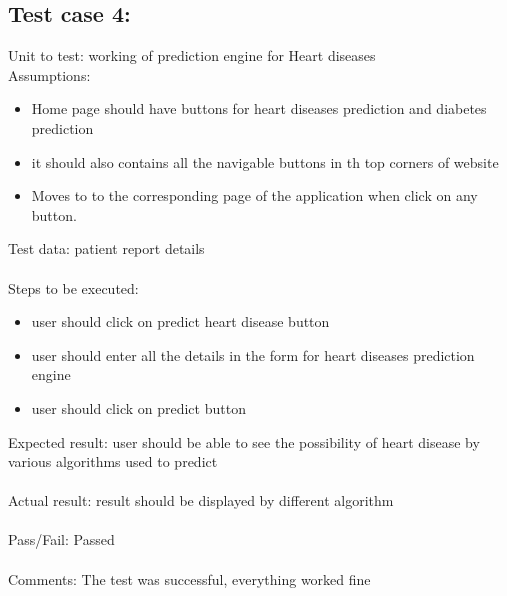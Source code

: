 \documentclass[oneside,12pt]{Classes/VTU}
\begin{document}
	\subsection{Test case 4:}
	Unit to test: working of prediction engine for Heart diseases \\
	Assumptions:\\
	\begin{itemize}
		\item Home page should have buttons for heart diseases prediction and diabetes prediction
		\item it should also contains all the navigable buttons in th top corners of website
		\item Moves to to the corresponding page of the application when click on any button.
	\end{itemize}
	Test data: patient report details\\
	\\
	Steps to be executed:\\
	\begin{itemize}
		\item user should click on predict heart disease button
		\item user should enter all the details in the form for heart diseases prediction engine
		\item user should click on predict button
	\end{itemize}
	Expected result:  user should be able to see the possibility of heart disease by various algorithms used to predict\\
	\\
	Actual result: result should be displayed by different algorithm\\
	\\
	Pass/Fail: Passed\\
	\\
	Comments: The test was successful, everything worked fine
	
\end{document}
